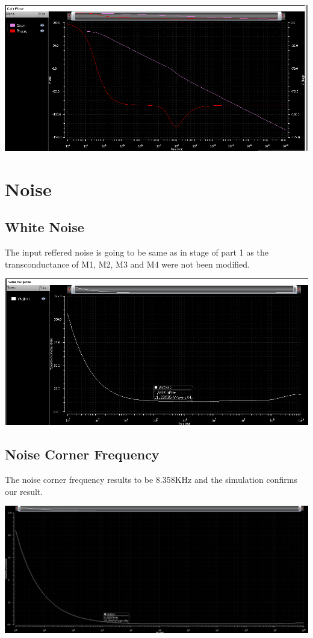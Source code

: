 \centering
\includegraphics[width=1\textwidth]{Capitoli/gain2.png}
\raggedright


\section{Noise} %
\label{sec:noise}


\subsection{White Noise} %
\label{sub:white_noise}

The input reffered noise is going to be same as in stage of part 1 as the transconductance of M1, M2, M3 and M4 were not been modified.

\centering
\includegraphics[width=1\textwidth]{Capitoli/wn.png}
\raggedright


\subsection{Noise Corner Frequency} %
\label{sub:noise_corner_frequency}

The noise corner frequency results to be 8.358KHz and the simulation confirms our result.




\centering
\includegraphics[width=1\textwidth]{Capitoli/ncf.png}
\raggedright



